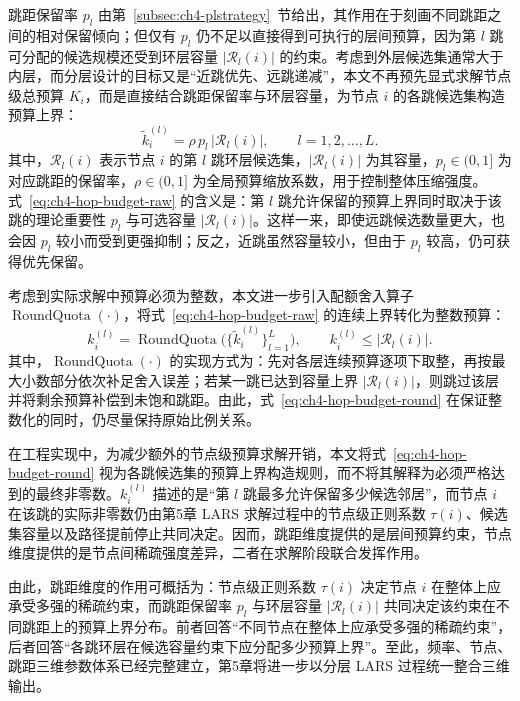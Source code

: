 跳距保留率 \(p_l\) 由第~\ref{subsec:ch4-plstrategy}~节给出，其作用在于刻画不同跳距之间的相对保留倾向；但仅有 \(p_l\) 仍不足以直接得到可执行的层间预算，因为第 \(l\) 跳可分配的候选规模还受到环层容量 \(|\mathcal{R}_l(i)|\) 的约束。考虑到外层候选集通常大于内层，而分层设计的目标又是“近跳优先、远跳递减”，本文不再预先显式求解节点级总预算 \(K_i\)，而是直接结合跳距保留率与环层容量，为节点 \(i\) 的各跳候选集构造预算上界：
\begin{equation}
  \tilde{k}_i^{(l)}
  =
  \rho \, p_l \, |\mathcal{R}_l(i)|,
  \qquad l=1,2,\dots,L.
  \label{eq:ch4-hop-budget-raw}
\end{equation}
其中，\(\mathcal{R}_l(i)\) 表示节点 \(i\) 的第 \(l\) 跳环层候选集，\(|\mathcal{R}_l(i)|\) 为其容量，\(p_l\in(0,1]\) 为对应跳距的保留率，\(\rho\in(0,1]\) 为全局预算缩放系数，用于控制整体压缩强度。式~\eqref{eq:ch4-hop-budget-raw} 的含义是：第 \(l\) 跳允许保留的预算上界同时取决于该跳的理论重要性 \(p_l\) 与可选容量 \(|\mathcal{R}_l(i)|\)。这样一来，即使远跳候选数量更大，也会因 \(p_l\) 较小而受到更强抑制；反之，近跳虽然容量较小，但由于 \(p_l\) 较高，仍可获得优先保留。

考虑到实际求解中预算必须为整数，本文进一步引入配额舍入算子 \(\operatorname{RoundQuota}(\cdot)\)，将式~\eqref{eq:ch4-hop-budget-raw} 的连续上界转化为整数预算：
\begin{equation}
  k_i^{(l)}
  =
  \operatorname{RoundQuota}\!\bigl(
    \{\tilde{k}_i^{(l)}\}_{l=1}^L
  \bigr),
  \qquad
  k_i^{(l)} \le |\mathcal{R}_l(i)|.
  \label{eq:ch4-hop-budget-round}
\end{equation}
其中，\(\operatorname{RoundQuota}(\cdot)\) 的实现方式为：先对各层连续预算逐项下取整，再按最大小数部分依次补足舍入误差；若某一跳已达到容量上界 \(|\mathcal{R}_l(i)|\)，则跳过该层并将剩余预算补偿到未饱和跳距。由此，式~\eqref{eq:ch4-hop-budget-round} 在保证整数化的同时，仍尽量保持原始比例关系。

在工程实现中，为减少额外的节点级预算求解开销，本文将式~\eqref{eq:ch4-hop-budget-round} 视为各跳候选集的预算上界构造规则，而不将其解释为必须严格达到的最终非零数。\(k_i^{(l)}\) 描述的是“第 \(l\) 跳最多允许保留多少候选邻居”，而节点 \(i\) 在该跳的实际非零数仍由第5章 LARS 求解过程中的节点级正则系数 \(\tau(i)\)、候选集容量以及路径提前停止共同决定。因而，跳距维度提供的是层间预算约束，节点维度提供的是节点间稀疏强度差异，二者在求解阶段联合发挥作用。

由此，跳距维度的作用可概括为：节点级正则系数 \(\tau(i)\) 决定节点 \(i\) 在整体上应承受多强的稀疏约束，而跳距保留率 \(p_l\) 与环层容量 \(|\mathcal{R}_l(i)|\) 共同决定该约束在不同跳距上的预算上界分布。前者回答“不同节点在整体上应承受多强的稀疏约束”，后者回答“各跳环层在候选容量约束下应分配多少预算上界”。至此，频率、节点、跳距三维参数体系已经完整建立，第5章将进一步以分层 LARS 过程统一整合三维输出。

